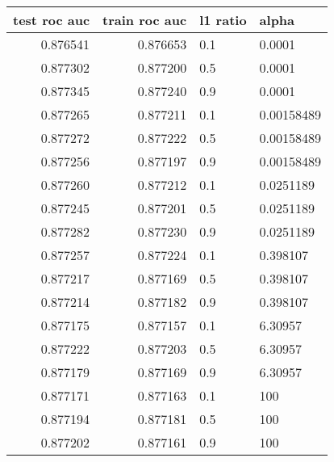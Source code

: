\begin{tabular}{rrll}
\toprule
 test roc auc &  train roc auc & l1 ratio &       alpha \\
\midrule
     0.876541 &       0.876653 &      0.1 &      0.0001 \\
     0.877302 &       0.877200 &      0.5 &      0.0001 \\
     0.877345 &       0.877240 &      0.9 &      0.0001 \\
     0.877265 &       0.877211 &      0.1 &  0.00158489 \\
     0.877272 &       0.877222 &      0.5 &  0.00158489 \\
     0.877256 &       0.877197 &      0.9 &  0.00158489 \\
     0.877260 &       0.877212 &      0.1 &   0.0251189 \\
     0.877245 &       0.877201 &      0.5 &   0.0251189 \\
     0.877282 &       0.877230 &      0.9 &   0.0251189 \\
     0.877257 &       0.877224 &      0.1 &    0.398107 \\
     0.877217 &       0.877169 &      0.5 &    0.398107 \\
     0.877214 &       0.877182 &      0.9 &    0.398107 \\
     0.877175 &       0.877157 &      0.1 &     6.30957 \\
     0.877222 &       0.877203 &      0.5 &     6.30957 \\
     0.877179 &       0.877169 &      0.9 &     6.30957 \\
     0.877171 &       0.877163 &      0.1 &         100 \\
     0.877194 &       0.877181 &      0.5 &         100 \\
     0.877202 &       0.877161 &      0.9 &         100 \\
\bottomrule
\end{tabular}
